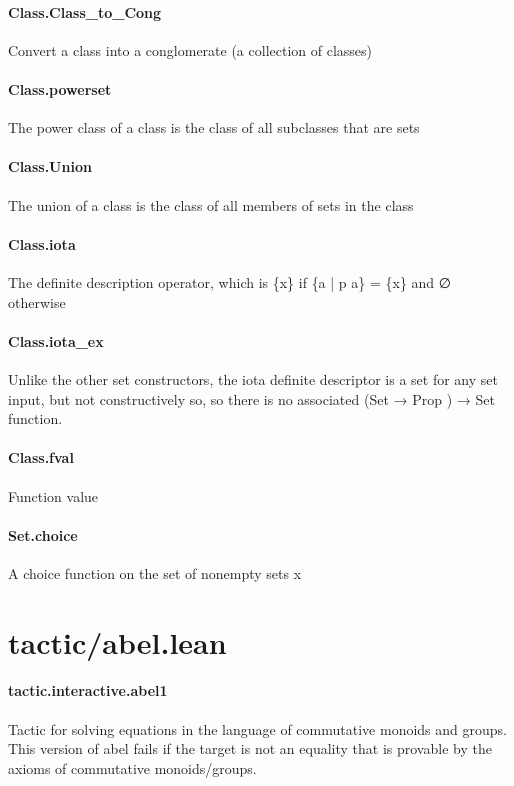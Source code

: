 \documentclass{article}
\begin{document}
\paragraph{Class.Class\_to\_Cong}
\par
Convert a class into a conglomerate (a collection of classes)
\paragraph{Class.powerset}
\par
The power class of a class is the class of all subclasses that are sets
\paragraph{Class.Union}
\par
The union of a class is the class of all members of sets in the class
\paragraph{Class.iota}
\par
The definite description operator, which is \{x\} if 
\colorbox[RGB]{253,246,227}{{{{\color[RGB]{101, 123, 131} \{a | p a\}  }}}{{{\color[RGB]{181, 137, 0} = }}}{{{\color[RGB]{101, 123, 131}  \{x\} }}}}and ∅ otherwise
\paragraph{Class.iota\_ex}
\par
Unlike the other set constructors, the 
\colorbox[RGB]{253,246,227}{{{{\color[RGB]{101, 123, 131} iota }}}} definite descriptor
is a set for any set input, but not constructively so, so there is no
associated 
\colorbox[RGB]{253,246,227}{{{{\color[RGB]{101, 123, 131} (Set  }}}{{{\color[RGB]{133, 153, 0} → }}}{{{\color[RGB]{101, 123, 131}   }}}{{{\color[RGB]{38, 139, 210} Prop }}}{{{\color[RGB]{101, 123, 131} )  }}}{{{\color[RGB]{133, 153, 0} → }}}{{{\color[RGB]{101, 123, 131}  Set }}}} function.
\paragraph{Class.fval}
\par
Function value
\paragraph{Set.choice}
\par
A choice function on the set of nonempty sets 
\colorbox[RGB]{253,246,227}{{{{\color[RGB]{101, 123, 131} x }}}}\section{tactic/abel.lean}\paragraph{tactic.interactive.abel1}
\par
Tactic for solving equations in the language of
commutative monoids and groups.
This version of 
\colorbox[RGB]{253,246,227}{{{{\color[RGB]{101, 123, 131} abel }}}} fails if the target is not an equality
that is provable by the axioms of commutative monoids/groups.
\end{document}
